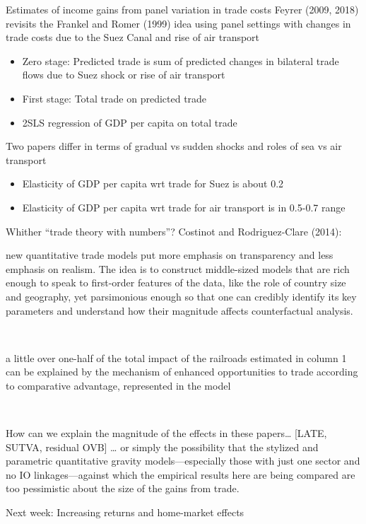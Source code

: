 \documentclass[10pt,notes=hide,aspectratio=169]{beamer}
\begin{document}
\begin{frame}{Estimates of income gains from panel variation in trade costs}
Feyrer (2009, 2018) revisits the Frankel and Romer (1999) idea using 
panel settings with changes in trade costs due to the Suez Canal and rise of air transport
\begin{itemize}
	\item Zero stage: Predicted trade is sum of predicted changes in bilateral trade flows due to Suez shock or rise of air transport
	\item First stage: Total trade on predicted trade
	\item 2SLS regression of GDP per capita on total trade
\end{itemize}
Two papers differ in terms of gradual vs sudden shocks and roles of sea vs air transport \\
\begin{itemize}
	\item Elasticity of GDP per capita wrt trade for Suez is about 0.2
	\item Elasticity of GDP per capita wrt trade for air transport is in 0.5-0.7 range
\end{itemize}
\end{frame}
\begin{frame}{Whither ``trade theory with numbers''?}
Costinot and Rodriguez-Clare (2014): \\
{\small
new quantitative trade models put more emphasis on transparency and less emphasis on realism. The idea is to construct middle-sized models that are rich enough to speak to first-order features of the data, like the role of country size and geography, yet parsimonious enough so that one can credibly identify its key parameters and understand how their magnitude affects counterfactual analysis.\par}
 \\
{\small a little over one-half of the total impact of the railroads estimated in column 1 can be explained by the mechanism of enhanced opportunities to trade according to comparative advantage, represented in the model\par}
 \\
{\small How can we explain the magnitude of the effects in these papers\dots
[LATE, SUTVA, residual OVB]
\dots
or simply the possibility that the stylized and parametric quantitative gravity models—especially those with just one sector and no IO linkages—against which the empirical results here are being compared are too pessimistic about the size of the gains from trade.
\par}
\end{frame}
\begin{frame}[plain]
Next week: Increasing returns and home-market effects
\end{frame}
\end{document}

